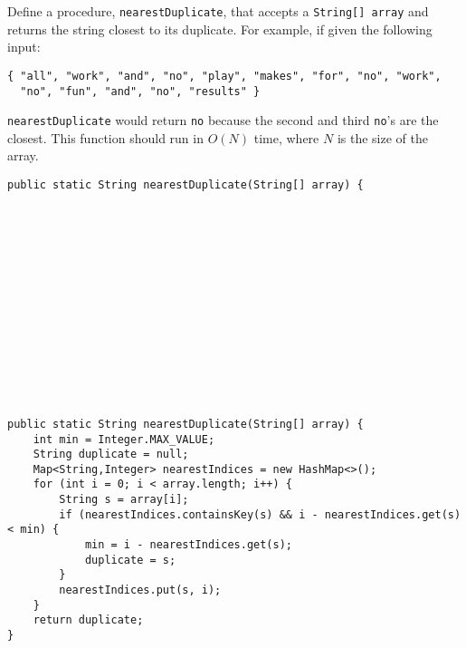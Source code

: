\begin{blocksection}
\question Define a procedure, \lstinline$nearestDuplicate$, that accepts a
\lstinline$String[] array$ and returns the string closest to its duplicate. For
example, if given the following input:

\begin{verbatim}
{ "all", "work", "and", "no", "play", "makes", "for", "no", "work",
  "no", "fun", "and", "no", "results" }
\end{verbatim}

\lstinline$nearestDuplicate$ would return \lstinline$no$ because the second and
third \lstinline$no$'s are the closest. This function should run in $O(N)$
time, where $N$ is the size of the array.

\ifprintanswers
\else
\begin{lstlisting}
public static String nearestDuplicate(String[] array) {















\end{lstlisting}
\fi

\begin{solution}
\begin{lstlisting}
public static String nearestDuplicate(String[] array) {
    int min = Integer.MAX_VALUE;
    String duplicate = null;
    Map<String,Integer> nearestIndices = new HashMap<>();
    for (int i = 0; i < array.length; i++) {
        String s = array[i];
        if (nearestIndices.containsKey(s) && i - nearestIndices.get(s) < min) {
            min = i - nearestIndices.get(s);
            duplicate = s;
        }
        nearestIndices.put(s, i);
    }
    return duplicate;
}
\end{lstlisting}
\end{solution}
\end{blocksection}
